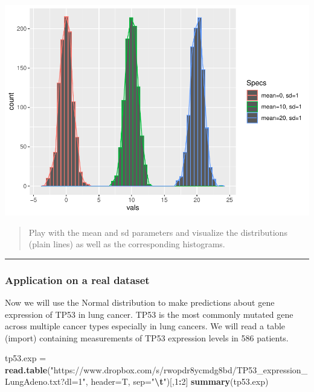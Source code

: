 \documentclass[
]{book}
\newenvironment{Shaded}{\begin{snugshade}}{\end{snugshade}}
\newcommand{\AttributeTok}[1]{\textcolor[rgb]{0.13,0.29,0.53}{#1}}
\newcommand{\DecValTok}[1]{\textcolor[rgb]{0.00,0.00,0.81}{#1}}
\newcommand{\FunctionTok}[1]{\textcolor[rgb]{0.13,0.29,0.53}{\textbf{#1}}}
\newcommand{\NormalTok}[1]{#1}
\newcommand{\OtherTok}[1]{\textcolor[rgb]{0.56,0.35,0.01}{#1}}
\newcommand{\SpecialCharTok}[1]{\textcolor[rgb]{0.81,0.36,0.00}{\textbf{#1}}}
\newcommand{\StringTok}[1]{\textcolor[rgb]{0.31,0.60,0.02}{#1}}
\begin{document}
\includegraphics{_main_files/figure-latex/unnamed-chunk-94-1.pdf}

\begin{quote}
Play with the mean and sd parameters and visualize the distributions (plain lines) as well as the corresponding histograms.
\end{quote}

\begin{center}\rule{0.5\linewidth}{0.5pt}\end{center}

\hypertarget{application-on-a-real-dataset}{%
\subsubsection{Application on a real dataset}\label{application-on-a-real-dataset}}

Now we will use the Normal distribution to make predictions about gene expression of TP53 in lung cancer. TP53 is the most commonly mutated gene across multiple cancer types especially in lung cancers. We will read a table (import) containing measurements of TP53 expression levels in 586 patients.

\begin{Shaded}
\begin{Highlighting}[]
\NormalTok{tp53.exp }\OtherTok{=} \FunctionTok{read.table}\NormalTok{(}\StringTok{"https://www.dropbox.com/s/rwopdr8ycmdg8bd/TP53\_expression\_LungAdeno.txt?dl=1"}\NormalTok{, }
                      \AttributeTok{header=}\NormalTok{T, }\AttributeTok{sep=}\StringTok{"}\SpecialCharTok{\textbackslash{}t}\StringTok{"}\NormalTok{)[,}\DecValTok{1}\SpecialCharTok{:}\DecValTok{2}\NormalTok{]}
\FunctionTok{summary}\NormalTok{(tp53.exp)}
\end{Highlighting}
\end{Shaded}
\end{document}
